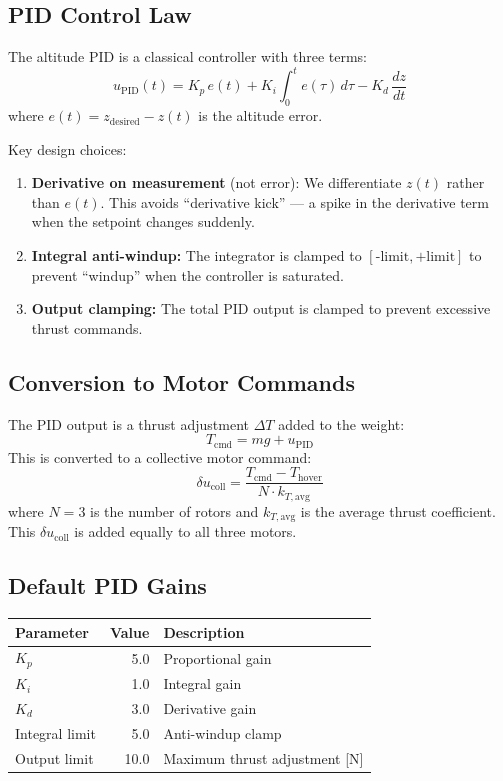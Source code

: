 \documentclass[12pt, a4paper]{article}
\begin{document}
\subsection{PID Control Law}

The altitude PID is a classical controller with three terms:
\begin{equation}
    u_{\text{PID}}(t) = K_p \, e(t) + K_i \int_0^t e(\tau) \, d\tau - K_d \, \frac{dz}{dt}
\end{equation}
where $e(t) = z_{\text{desired}} - z(t)$ is the altitude error.

Key design choices:
\begin{enumerate}
    \item \textbf{Derivative on measurement} (not error): We differentiate $z(t)$ rather than $e(t)$.  This avoids ``derivative kick'' --- a spike in the derivative term when the setpoint changes suddenly.
    \item \textbf{Integral anti-windup:} The integrator is clamped to $[\text{-limit}, \text{+limit}]$ to prevent ``windup'' when the controller is saturated.
    \item \textbf{Output clamping:} The total PID output is clamped to prevent excessive thrust commands.
\end{enumerate}

\subsection{Conversion to Motor Commands}

The PID output is a thrust adjustment $\Delta T$ added to the weight:
\begin{equation}
    T_{\text{cmd}} = mg + u_{\text{PID}}
\end{equation}
This is converted to a collective motor command:
\begin{equation}
    \delta u_{\text{coll}} = \frac{T_{\text{cmd}} - T_{\text{hover}}}{N \cdot k_{T,\text{avg}}}
\end{equation}
where $N = 3$ is the number of rotors and $k_{T,\text{avg}}$ is the average thrust coefficient.  This $\delta u_{\text{coll}}$ is added equally to all three motors.

\subsection{Default PID Gains}

\begin{table}[H]
\centering
\begin{tabular}{lrl}
\toprule
Parameter & Value & Description \\
\midrule
$K_p$ & 5.0 & Proportional gain \\
$K_i$ & 1.0 & Integral gain \\
$K_d$ & 3.0 & Derivative gain \\
Integral limit & 5.0 & Anti-windup clamp \\
Output limit & 10.0 & Maximum thrust adjustment [N] \\
\bottomrule
\end{tabular}
\end{table}
\end{document}

